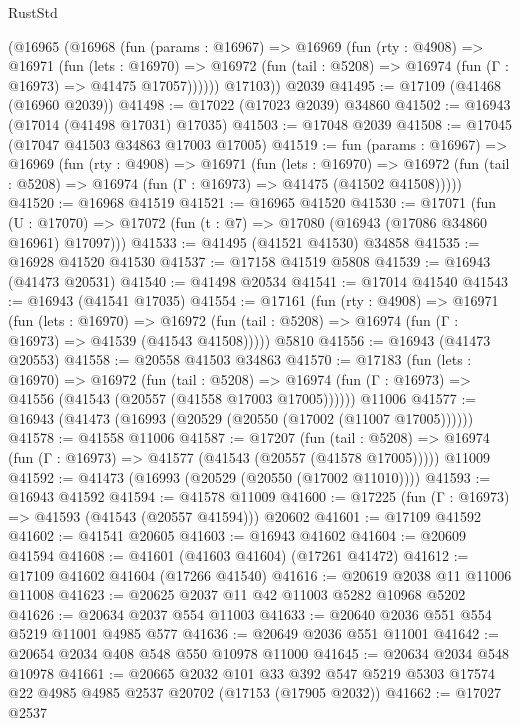 \begin{lexlean}{RustStd}
\begin{coremodule}
      (@16965
        (@16968
          (fun (params : @16967) =>
          @16969
            (fun (rty : @4908) =>
            @16971
              (fun (lets : @16970) =>
              @16972 (fun (tail : @5208) => @16974 (fun (Γ : @16973) => @41475 @17057))))))
        @17103))
    @2039
@41495 := @17109 (@41468 (@16960 @2039))
@41498 := @17022 (@17023 @2039) @34860
@41502 := @16943 (@17014 (@41498 @17031) @17035)
@41503 := @17048 @2039
@41508 := @17045 (@17047 @41503 @34863 @17003 @17005)
@41519 := fun (params : @16967) =>
  @16969
    (fun (rty : @4908) =>
    @16971
      (fun (lets : @16970) =>
      @16972 (fun (tail : @5208) => @16974 (fun (Γ : @16973) => @41475 (@41502 @41508)))))
@41520 := @16968 @41519
@41521 := @16965 @41520
@41530 := @17071
    (fun (U : @17070) => @17072 (fun (t : @7) => @17080 (@16943 (@17086 @34860 @16961) @17097)))
@41533 := @41495 (@41521 @41530) @34858
@41535 := @16928 @41520 @41530
@41537 := @17158 @41519 @5808
@41539 := @16943 (@41473 @20531)
@41540 := @41498 @20534
@41541 := @17014 @41540
@41543 := @16943 (@41541 @17035)
@41554 := @17161
    (fun (rty : @4908) =>
    @16971
      (fun (lets : @16970) =>
      @16972 (fun (tail : @5208) => @16974 (fun (Γ : @16973) => @41539 (@41543 @41508)))))
    @5810
@41556 := @16943 (@41473 @20553)
@41558 := @20558 @41503 @34863
@41570 := @17183
    (fun (lets : @16970) =>
    @16972
      (fun (tail : @5208) =>
      @16974 (fun (Γ : @16973) => @41556 (@41543 (@20557 (@41558 @17003 @17005))))))
    @11006
@41577 := @16943 (@41473 (@16993 (@20529 (@20550 (@17002 (@11007 @17005))))))
@41578 := @41558 @11006
@41587 := @17207
    (fun (tail : @5208) => @16974 (fun (Γ : @16973) => @41577 (@41543 (@20557 (@41578 @17005)))))
    @11009
@41592 := @41473 (@16993 (@20529 (@20550 (@17002 @11010))))
@41593 := @16943 @41592
@41594 := @41578 @11009
@41600 := @17225 (fun (Γ : @16973) => @41593 (@41543 (@20557 @41594))) @20602
@41601 := @17109 @41592
@41602 := @41541 @20605
@41603 := @16943 @41602
@41604 := @20609 @41594
@41608 := @41601 (@41603 @41604) (@17261 @41472)
@41612 := @17109 @41602 @41604 (@17266 @41540)
@41616 := @20619 @2038 @11 @11006 @11008
@41623 := @20625 @2037 @11 @42 @11003 @5282 @10968 @5202
@41626 := @20634 @2037 @554 @11003
@41633 := @20640 @2036 @551 @554 @5219 @11001 @4985 @577
@41636 := @20649 @2036 @551 @11001
@41642 := @20654 @2034 @408 @548 @550 @10978 @11000
@41645 := @20634 @2034 @548 @10978
@41661 := @20665
    @2032
    @101
    @33
    @392
    @547
    @5219
    @5303
    @17574
    @22
    @4985
    @4985
    @2537
    @20702
    (@17153 (@17905 @2032))
@41662 := @17027 @2537

\end{coremodule}
\end{lexlean}
